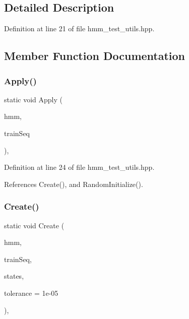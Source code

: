 \subsection{Detailed Description}


Definition at line 21 of file hmm\+\_\+test\+\_\+utils.\+hpp.



\subsection{Member Function Documentation}
\mbox{\label{structInitHMMModel_a3b7981fd17dd8132c10744e7d088c347}} 
\subsubsection{Apply()}
{\footnotesize\ttfamily static void Apply (\begin{DoxyParamCaption}\item[{H\+M\+M\+Type \&}]{hmm,  }\item[{vector$<$ mat $>$ $\ast$}]{train\+Seq }\end{DoxyParamCaption})\hspace{0.3cm}{\ttfamily [inline]}, {\ttfamily [static]}}



Definition at line 24 of file hmm\+\_\+test\+\_\+utils.\+hpp.



References Create(), and Random\+Initialize().

\mbox{\label{structInitHMMModel_a457b36f139f6a11e38f793ffb1276b38}} 
\subsubsection{Create()\hspace{0.1cm}{\footnotesize\ttfamily [1/4]}}
{\footnotesize\ttfamily static void Create (\begin{DoxyParamCaption}\item[{H\+MM$<$ Discrete\+Distribution $>$ \&}]{hmm,  }\item[{vector$<$ mat $>$ \&}]{train\+Seq,  }\item[{size\+\_\+t}]{states,  }\item[{double}]{tolerance = {\ttfamily 1e-\/05} }\end{DoxyParamCaption})\hspace{0.3cm}{\ttfamily [inline]}, {\ttfamily [static]}}



